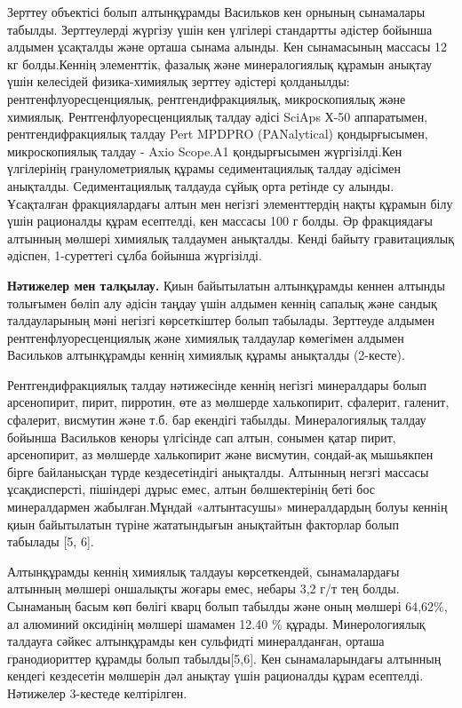\begin{multicols}{2}

Зерттеу объектісі болып алтынқұрамды Васильков кен орнының сынамалары
табылды. Зерттеулерді жүргізу үшін кен үлгілері стандартты әдістер
бойынша алдымен ұсақталды және орташа сынама алынды. Кен сынамасының
массасы 12 кг болды.Кеннің элементтік, фазалық және минералогиялық
құрамын анықтау үшін келесідей физика-химиялық зерттеу әдістері
қолданылды: рентгенфлуоресценциялық, рентгендифракциялық, микроскопиялық
және химиялық. Рентгенфлуоресценциялық талдау әдісі SciAps Х-50
аппаратымен, рентгендифракциялық талдау Pert MPDPRO (PANalytical)
қондырғысымен, микроскопиялық талдау - Axio Scope.A1 қондырғысымен
жүргізілді.Кен үлгілерінің гранулометриялық құрамы седиментациялық
талдау әдісімен анықталды. Седиментациялық талдауда сұйық орта ретінде
су алынды. Ұсақталған фракциялардағы алтын мен негізгі элементтердің
нақты құрамын білу үшін рационалды құрам есептелді, кен массасы 100 г
болды. Әр фракциядағы алтынның мөлшері химиялық талдаумен анықталды.
Кенді байыту гравитациялық әдіспен, 1-суреттегі сұлба бойынша
жүргізілді.

{\bfseries Нәтижелер мен талқылау.} Қиын байытылатын алтынқұрамды кеннен алтынды толығымен бөліп алу әдісін
таңдау үшін алдымен кеннің сапалық және сандық талдауларының мәні
негізгі көрсеткіштер болып табылады. Зерттеуде алдымен
рентгенфлуоресценциялық және химиялық талдаулар көмегімен алдымен
Васильков алтынқұрамды кеннің химиялық құрамы анықталды (2-кесте).

Рентгендифракциялық талдау нәтижесінде кеннің негізгі минералдары болып
арсенопирит, пирит, пирротин, өте аз мөлшерде халькопирит, сфалерит,
галенит, сфалерит, висмутин және т.б. бар екендігі табылды.
Минералогиялық талдау бойынша Васильков кеноры үлгісінде сап алтын,
сонымен қатар пирит, арсенопирит, аз мөлшерде халькопирит және висмутин,
сондай-ақ мышьякпен бірге байланысқан түрде кездесетіндігі анықталды.
Алтынның негзгі массасы ұсақдисперсті, пішіндері дұрыс емес, алтын
бөлшектерінің беті бос минералдармен жабылған.Мұндай «алтынтасушы»
минералдардың болуы кеннің қиын байытылатын түріне жататындығын
анықтайтын факторлар болып табылады {[}5, 6{]}.

Алтынқұрамды кеннің химиялық талдауы көрсеткендей, сынамалардағы
алтынның мөлшері оншалықты жоғары емес, небары 3,2 г/т тең болды.
Сынаманың басым көп бөлігі кварц болып табылды және оның мөлшері
64,62\%, ал алюминий оксидінің мөлшері шамамен 12.40 \% құрады.
Минерологиялық талдауға сәйкес алтынқұрамды кен сульфидті минералданған,
орташа гранодиориттер құрамды болып табылды{[}5,6{]}. Кен
сынамаларындағы алтынның кендегі кездесетін мөлшерін дәл анықтау үшін
рационалды құрам есептелді. Нәтижелер 3-кестеде келтірілген.



\end{multicols}
